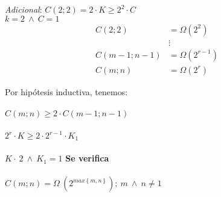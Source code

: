 \documentclass[conference]{IEEEtran}
\begin{document}
\textit{Adicional}:
$C\left(2;2\right)=2\cdot K\ge 2^2\cdot C$\\
$k=2\:\wedge \:C=1$\\

\begin{align*}
   C\left(2;2\right)&=\Omega \left(2^2\right) \\
   &\vdots\\
   C\left(m-1;n-1\right)&=\Omega \left(2^{r-1}\right)\\
   C\left(m;n\right)&=\Omega \left(2^r\right)
\end{align*}

\newpage

Por hipótesis inductiva, tenemos:\\\\
$C\left(m;n\right)\ge 2\cdot C\left(m-1;n-1\right)$\\\\
$2^r\cdot K\ge 2\cdot 2^{r-1}\cdot K_1$\\\\
$K\cdot \:2\:\wedge \:K_1=1$ \textbf{Se verifica}\\\\
$C\left(m;n\right)=\Omega \:\left(2^{max\left\{m,n\right\}}\right);\:m\:\wedge \:n \neq 1$
\end{document}
